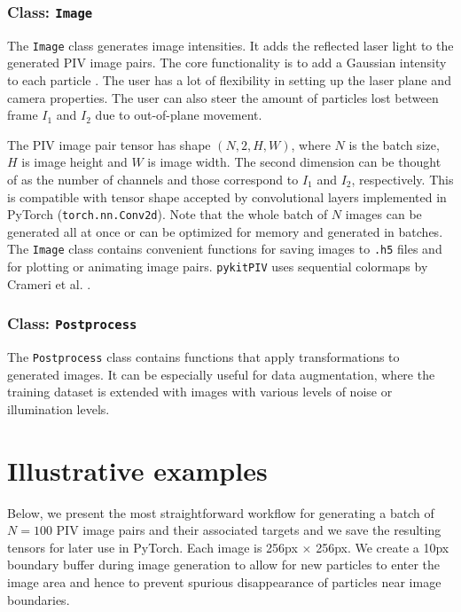 \documentclass[a4paper,fleqn]{cas-dc}
\begin{document}
\subsubsection{Class: \texttt{Image}} \label{sec:class-Image}

The \texttt{Image} class generates image intensities. It adds the reflected laser light to the generated PIV image pairs. The core functionality is to add a Gaussian intensity to each particle \citep{olsen2000out, rabault2017performing}. The user has a lot of flexibility in setting up the laser plane and camera properties. The user can also steer the amount of particles lost between frame $I_1$ and $I_2$ due to out-of-plane movement.

The PIV image pair tensor has shape $(N, 2, H, W)$, where $N$ is the batch size, $H$ is image height and $W$ is image width. The second dimension can be thought of as the number of channels and those correspond to $I_1$ and $I_2$, respectively. This is compatible with tensor shape accepted by convolutional layers implemented in PyTorch (\texttt{torch.nn.Conv2d}). Note that the whole batch of $N$ images can be generated all at once or can be optimized for memory and generated in batches. The \texttt{Image} class contains convenient functions for saving images to \texttt{.h5} files and for plotting or animating image pairs. \texttt{pykitPIV} uses sequential colormaps by Crameri et al. \cite{crameri2020misuse}.

\subsubsection{Class: \texttt{Postprocess}} \label{sec:class-Postprocess}

The \texttt{Postprocess} class contains functions that apply transformations to generated images. It can be especially useful for data augmentation, where the training dataset is extended with images with various levels of noise or illumination levels.

\section{Illustrative examples} \label{sec:examples}

Below, we present the most straightforward workflow for generating a batch of $N=100$ PIV image pairs and their associated targets and we save the resulting tensors for later use in PyTorch. Each image is 256px $\times$ 256px. We create a 10px boundary buffer during image generation to allow for new particles to enter the image area and hence to prevent spurious disappearance of particles near image boundaries.
\end{document}

